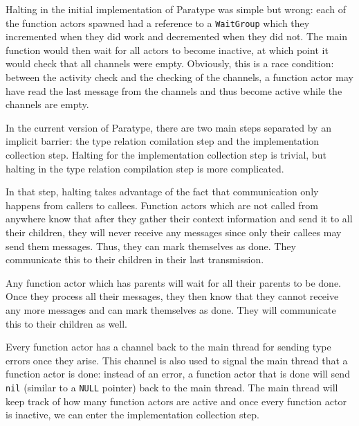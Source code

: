 \documentclass{acm_proc_article-sp}
\begin{document}
		Halting in the initial implementation of Paratype was simple but wrong:
		each of the function actors spawned had a reference to a
		\texttt{WaitGroup} which they incremented when they did work and
		decremented when they did not. The main function would then wait for
		all actors to become inactive, at which point it would check that all
		channels were empty.  Obviously, this is a race condition: between the
		activity check and the checking of the channels, a function actor may
		have read the last message from the channels and thus become active
		while the channels are empty.

		In the current version of Paratype, there are two main steps separated
		by an implicit barrier: the type relation comilation step and the
		implementation collection step. Halting for the implementation
		collection step is trivial, but halting in the type relation
		compilation step is more complicated. 
		
		In that step, halting takes advantage of the fact
		that communication only happens from callers to callees. Function
		actors which are not called from anywhere know that after they gather
		their context information and send it to all their children, they will
		never receive any messages since only their callees may send them
		messages. Thus, they can mark themselves as done. They communicate this
		to their children in their last transmission.

		Any function actor which has parents will wait for all their parents to
		be done. Once they process all their messages, they then know that they
		cannot receive any more messages and can mark themselves as done. They
		will communicate this to their children as well.

		Every function actor has a channel back to the main thread for sending
		type errors once they arise. This channel is also used to signal the
		main thread that a function actor is done: instead of an error, a
		function actor that is done will send \lstinline!nil! (similar to a
		\lstinline!NULL! pointer) back to the main thread. The main thread will
		keep track of how many function actors are active and once every
		function actor is inactive, we can enter the implementation collection
		step.

\end{document}
